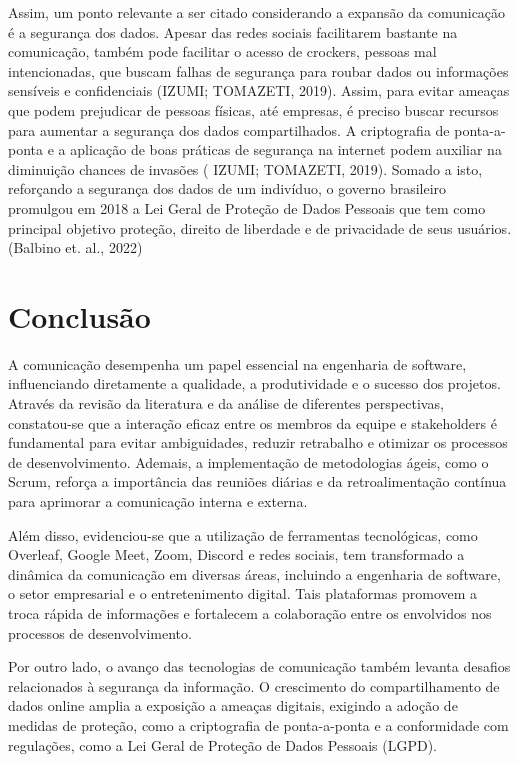\documentclass[12pt,oneside,a4paper,article]{abntex2}
\begin{document}
Assim, um ponto relevante a ser citado considerando a expansão da comunicação é a segurança dos dados. Apesar das redes sociais facilitarem bastante na comunicação,  também pode facilitar o acesso de crockers, pessoas mal intencionadas, que buscam falhas de segurança para roubar dados ou informações sensíveis e confidenciais (IZUMI; TOMAZETI, 2019). Assim, para evitar ameaças que podem prejudicar de pessoas físicas, até empresas, é preciso buscar recursos para aumentar a segurança dos dados compartilhados. A criptografia de ponta-a-ponta e a aplicação de boas práticas de segurança na internet podem auxiliar na diminuição chances de invasões ( IZUMI; TOMAZETI, 2019). Somado a isto, reforçando a segurança dos dados de um indivíduo, o governo brasileiro promulgou em 2018 a Lei Geral de Proteção de Dados  Pessoais que tem como principal  objetivo   proteção,  direito  de  liberdade  e  de  privacidade  de  seus usuários. (Balbino et. al., 2022)



\section{Conclusão}
A comunicação desempenha um papel essencial na engenharia de software, influenciando diretamente a qualidade, a produtividade e o sucesso dos projetos. Através da revisão da literatura e da análise de diferentes perspectivas, constatou-se que a interação eficaz entre os membros da equipe e stakeholders é fundamental para evitar ambiguidades, reduzir retrabalho e otimizar os processos de desenvolvimento. Ademais, a implementação de metodologias ágeis, como o Scrum, reforça a importância das reuniões diárias e da retroalimentação contínua para aprimorar a comunicação interna e externa.

Além disso, evidenciou-se que a utilização de ferramentas tecnológicas, como Overleaf, Google Meet, Zoom, Discord e redes sociais, tem transformado a dinâmica da comunicação em diversas áreas, incluindo a engenharia de software, o setor empresarial e o entretenimento digital. Tais plataformas promovem a troca rápida de informações e fortalecem a colaboração entre os envolvidos nos processos de desenvolvimento.

Por outro lado, o avanço das tecnologias de comunicação também levanta desafios relacionados à segurança da informação. O crescimento do compartilhamento de dados online amplia a exposição a ameaças digitais, exigindo a adoção de medidas de proteção, como a criptografia de ponta-a-ponta e a conformidade com regulações, como a Lei Geral de Proteção de Dados Pessoais (LGPD).
\end{document}
